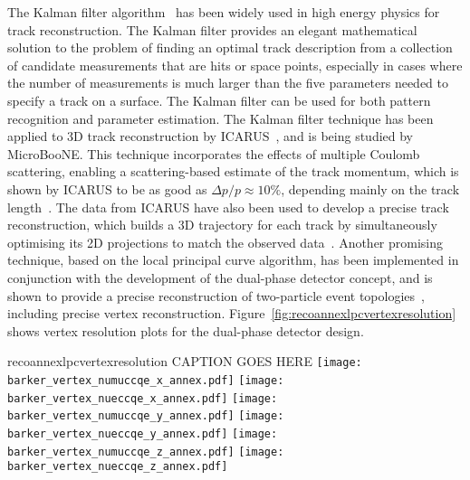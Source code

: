 The Kalman filter algorithm~\cite{kalman} has been widely used in high
energy physics for track reconstruction. The Kalman filter provides an
elegant mathematical solution to the problem of finding an optimal
track description from a collection of candidate measurements that are
hits or space points, especially in cases where the number of
measurements is much larger than the five parameters needed to specify
a track on a surface.  The Kalman filter can be used for both pattern
recognition and parameter estimation.
The Kalman filter technique has been applied
to 3D track reconstruction by ICARUS~\cite{Ankowski:2006ts}, and is being studied by MicroBooNE.
This technique incorporates the effects of multiple Coulomb scattering,
enabling a scattering-based estimate of the track momentum,
which is shown by ICARUS to be as good as $\Delta p/p \approx 10\%$, 
depending mainly on the track length~\cite{Ankowski:2006ts}.
The data from ICARUS have also been used to develop a precise
track reconstruction, which builds a 3D trajectory for each track by simultaneously
optimising its 2D projections to match the observed data~\cite{Antonello:2012hu}.
Another promising technique, based on the local principal curve algorithm, 
has been implemented in conjunction with the development of the 
dual-phase detector concept, and is shown to provide 
a precise reconstruction of two-particle event topologies~\cite{Back:2013cva,LAGUNA-LBNO-deliv},
including precise vertex reconstruction.
Figure~\ref{fig:recoannexlpcvertexresolution} shows vertex resolution plots for the dual-phase detector design.

\begin{cdrfigure}{recoannexlpcvertexresolution}
{CAPTION GOES HERE}
\texttt{[image: barker\_vertex\_numuccqe\_x\_annex.pdf]}
\texttt{[image: barker\_vertex\_nueccqe\_x\_annex.pdf]}
\texttt{[image: barker\_vertex\_numuccqe\_y\_annex.pdf]}
\texttt{[image: barker\_vertex\_nueccqe\_y\_annex.pdf]}
\texttt{[image: barker\_vertex\_numuccqe\_z\_annex.pdf]}
\texttt{[image: barker\_vertex\_nueccqe\_z\_annex.pdf]}
\end{cdrfigure}



